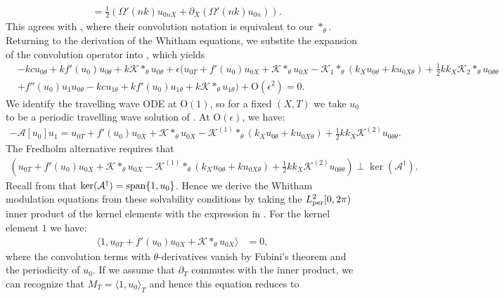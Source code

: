 \documentclass[11pt,leqno]{article}
\numberwithin{equation}{section}
\newcommand{\Span}{{\rm span}}
\theoremstyle{definition}
\begin{document}
\begin{appendices}
\begin{align*}
		&= \frac{1}{2}\left(\Omega'(nk)u_{0nX} + \partial_{X}(\Omega'(nk)u_{0n})\right).
	\end{align*}
	This agrees with \cite[Lemma 1]{BIHS2021}, where their convolution notation is equivalent to our $ *_{\theta} $. Returning to the derivation of the Whitham equations, we substite the expansion of the convolution operator into , which yields
	\begin{align*}
		&-kcu_{0\theta} + kf'(u_{0})u_{0\theta} + k\mathcal{K}*_{\theta}u_{0\theta} + \epsilon\bigg(u_{0T} + f'(u_{0})u_{0X} + \mathcal{K}*_{\theta}u_{0X} - \mathcal{K}_{1}*_{\theta}(k_{X}u_{0\theta} + ku_{0X\theta}) + \frac{1}{2}kk_{X}\mathcal{K}_{2}*_{\theta}u_{0\theta\theta}\\
		&+ f''(u_{0})u_{1}u_{0\theta} -kcu_{1\theta} + kf'(u_{0})u_{1\theta} + k\mathcal{K}*_{\theta}u_{1\theta}\bigg) + \mathrm{O}(\epsilon^{2}) = 0.
	\end{align*}
	We identify the travelling wave ODE at $ \mathrm{O}(1) $, so for a fixed $ (X,T) $ we take $ u_{0} $ to be a periodic travelling wave solution of . At $ \mathrm{O}(\epsilon) $, we have:
	\begin{align*}
		-\mathcal{A}[u_{0}]u_{1} = u_{0T} + f'(u_{0})u_{0X} + \mathcal{K}*_{\theta}u_{0X} - \mathcal{K}^{(1)}*_{\theta}(k_{X}u_{0\theta} + ku_{0X\theta}) + \frac{1}{2}kk_{X}\mathcal{K}^{(2)}u_{0\theta\theta}.
	\end{align*}
	The Fredholm alternative requires that
	\begin{align}
		\left(u_{0T} + f'(u_{0})u_{0X} + \mathcal{K}*_{\theta}u_{0X} - \mathcal{K}^{(1)}*_{\theta}(k_{X}u_{0\theta} + ku_{0X\theta}) + \frac{1}{2}kk_{X}\mathcal{K}^{(2)}u_{0\theta\theta}\right)\perp\ker(\mathcal{A}^{\dagger}). \label{e:fredholmwhitham}
	\end{align}
	Recall from  that  $ \ker(\mathcal{A}^{\dagger}) = \Span\{1,u_{0}\} $. Hence we derive the Whitham modulation equations from these solvability conditions by taking the $ L^{2}_{\rm per}[0,2\pi) $ inner product of the kernel elements with the expression in . For the kernel element $ 1 $ we have:
	\begin{align*}
		\langle 1,u_{0T} + f'(u_{0})u_{0X} + \mathcal{K}*_{\theta}u_{0X}\rangle &= 0,
	\end{align*}
	where the convolution terms with $ \theta $-derivatives vanish by Fubini's theorem and the periodicity of $ u_{0} $. If we assume that $ \partial_{T} $ commutes with the inner product, we can recognize that $ M_{T} = \langle 1, u_{0} \rangle_{T} $ and hence this equation reduces to

\end{appendices}
\end{document}
